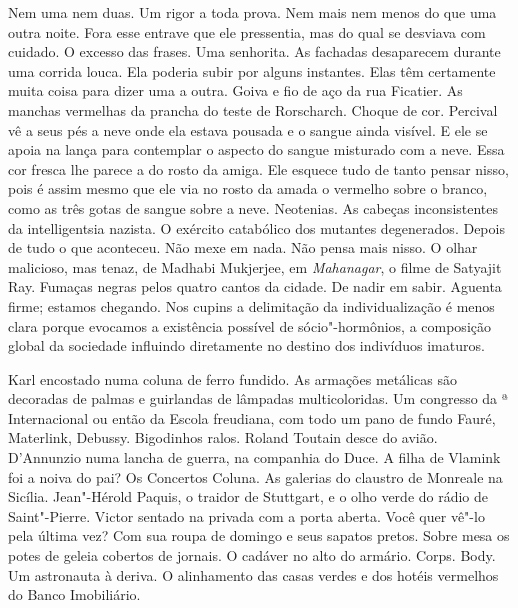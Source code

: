 Nem uma nem duas. Um rigor a toda prova. Nem mais nem menos do que uma
outra noite. Fora esse entrave que ele pressentia, mas do qual se
desviava com cuidado. O excesso das frases. Uma senhorita. As fachadas
desaparecem durante uma corrida louca. Ela poderia subir por alguns
instantes. Elas têm certamente muita coisa para dizer uma a outra. Goiva
e fio de aço da rua Ficatier. As manchas vermelhas da prancha  do
teste de Rorscharch. Choque de cor. Percival vê a seus pés a neve onde
ela estava pousada e o sangue ainda visível. E ele se apoia na lança
para contemplar o aspecto do sangue misturado com a neve. Essa cor
fresca lhe parece a do rosto da amiga. Ele esquece tudo de tanto pensar
nisso, pois é assim mesmo que ele via no rosto da amada o vermelho sobre
o branco, como as três gotas de sangue sobre a neve. Neotenias. As
cabeças inconsistentes da intelligentsia nazista. O exército catabólico
dos mutantes degenerados. Depois de tudo o que aconteceu. Não mexe em
nada. Não pensa mais nisso. O olhar malicioso, mas tenaz, de Madhabi
Mukjerjee, em \emph{Mahanagar}, o filme de Satyajit Ray. Fumaças negras
pelos quatro cantos da cidade. De nadir em sabir. Aguenta firme; estamos
chegando. Nos cupins a delimitação da individualização é menos clara
porque evocamos a existência possível de sócio"-hormônios, a composição
global da sociedade influindo diretamente no destino dos indivíduos
imaturos.

Karl encostado numa coluna de ferro fundido. As armações metálicas são
decoradas de palmas e guirlandas de lâmpadas multicoloridas. Um
congresso da ª Internacional ou então da Escola freudiana, com todo um
pano de fundo Fauré, Materlink, Debussy. Bigodinhos ralos. Roland
Toutain desce do avião. D'Annunzio numa lancha de guerra, na companhia
do Duce. A filha de Vlamink foi a noiva do pai? Os Concertos Coluna. As
galerias do claustro de Monreale na Sicília. Jean"-Hérold Paquis, o
traidor de Stuttgart, e o olho verde do rádio de Saint"-Pierre. Victor
sentado na privada com a porta aberta. Você quer vê"-lo pela última vez?
Com sua roupa de domingo e seus sapatos pretos. Sobre mesa os potes de
geleia cobertos de jornais. O cadáver no alto do armário. Corps. Body.
Um astronauta à deriva. O alinhamento das casas verdes e dos hotéis
vermelhos do Banco Imobiliário.

